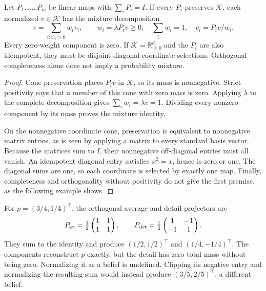 \begin{proposition}\label{r:positive-packets}
Let $P_1,\ldots,P_m$ be linear maps with $\sum_iP_i=I$. If every $P_i$ preserves $\mathcal K$, each normalized $v\in\mathcal K$ has the mixture decomposition
\[
 v=\sum_{i:w_i>0}w_i v_i,\qquad
 w_i=\lambda P_iv\ge0,\quad \sum_iw_i=1,\quad v_i=P_iv/w_i.
\]
Every zero-weight component is zero. If $\mathcal K=\mathbb R^d_{\ge0}$ and the $P_i$ are also idempotent, they must be disjoint diagonal coordinate selections. Orthogonal completeness alone does not imply a probability mixture.
\end{proposition}
\begin{proof}
Cone preservation places $P_iv$ in $\mathcal K$, so its mass is nonnegative. Strict positivity says that a member of this cone with zero mass is zero. Applying $\lambda$ to the complete decomposition gives $\sum_iw_i=\lambda v=1$. Dividing every nonzero component by its mass proves the mixture identity.

On the nonnegative coordinate cone, preservation is equivalent to nonnegative matrix entries, as is seen by applying a matrix to every standard basis vector. Because the matrices sum to $I$, their nonnegative off-diagonal entries must all vanish. An idempotent diagonal entry satisfies $x^2=x$, hence is zero or one. The diagonal sums are one, so each coordinate is selected by exactly one map. Finally, completeness and orthogonality without positivity do not give the first premise, as the following example shows.
\end{proof}

\begin{counterexample}\label{ce:signed-packet}
For $p=(3/4,1/4)^\top$, the orthogonal average and detail projectors are
\[
 P_{\rm av}=\tfrac12\begin{pmatrix}1&1\\1&1\end{pmatrix},\qquad
 P_{\rm det}=\tfrac12\begin{pmatrix}1&-1\\-1&1\end{pmatrix}.
\]
They sum to the identity and produce $(1/2,1/2)^\top$ and $(1/4,-1/4)^\top$. The components reconstruct $p$ exactly, but the detail has zero total mass without being zero. Normalizing it as a belief is undefined. Clipping its negative entry and normalizing the resulting sum would instead produce $(3/5,2/5)^\top$, a different belief.
\end{counterexample}

